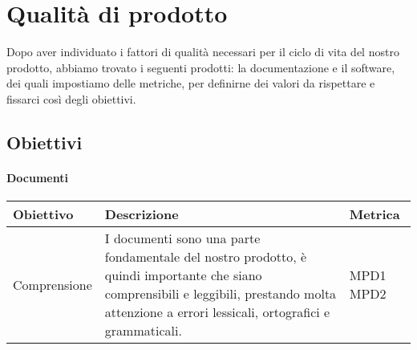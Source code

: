 \chapter{Qualità di prodotto}
Dopo aver individuato i fattori di qualità necessari per il ciclo di vita del nostro prodotto, abbiamo trovato i seguenti prodotti: la documentazione
e il software, dei quali impostiamo delle metriche, per definirne dei valori da rispettare e fissarci così degli obiettivi.
\section{Obiettivi}
\subsubsection{Documenti}
\begin{center}
  \begin{tabular}{|p{3cm}|p{7.5cm}|p{2cm}|} \hline
    \textbf{Obiettivo} & \textbf{Descrizione} & \textbf{Metrica}  \\ \hline
    Comprensione & I documenti sono una parte fondamentale del nostro prodotto, è quindi importante che siano comprensibili e leggibili, prestando molta attenzione
    a errori lessicali, ortografici e grammaticali.  & MPD1 \newline MPD2       \\ \hline
  \end{tabular}
\end{center}

